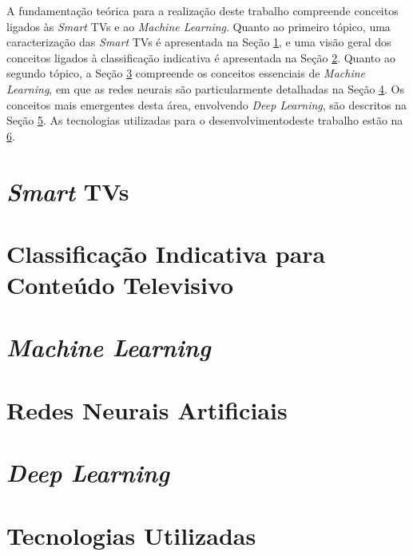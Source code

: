 
A fundamentação teórica para a realização deste trabalho compreende conceitos ligados às  \emph{Smart} TVs e ao \emph{Machine Learning}. Quanto ao primeiro tópico, uma caracterização das \emph{Smart} TVs é apresentada na Seção \ref{sec:smarttv}, e uma visão geral dos conceitos ligados à classificação indicativa é apresentada na Seção \ref{sec:classificacaoIndicativa}. Quanto ao segundo tópico, a Seção \ref{sec:machineLearning} compreende os conceitos essenciais de \emph{Machine Learning}, em que as redes neurais são particularmente detalhadas na Seção \ref{sec:rnas}. Os conceitos mais emergentes desta área, envolvendo \emph{Deep Learning}, são descritos na Seção \ref{sec:dl}. As tecnologias utilizadas para o desenvolvimentodeste trabalho estão na \ref{sec:tecs}.

\section{\emph{Smart} TVs} \label{sec:smarttv}


\section{Classificação Indicativa para Conteúdo Televisivo} \label{sec:classificacaoIndicativa}


\section{\emph{Machine Learning}} \label{sec:machineLearning}


\section{Redes Neurais Artificiais} \label{sec:rnas}


\section{\emph{Deep Learning}}\label{sec:dl}


\section{Tecnologias Utilizadas}\label{sec:tecs}

